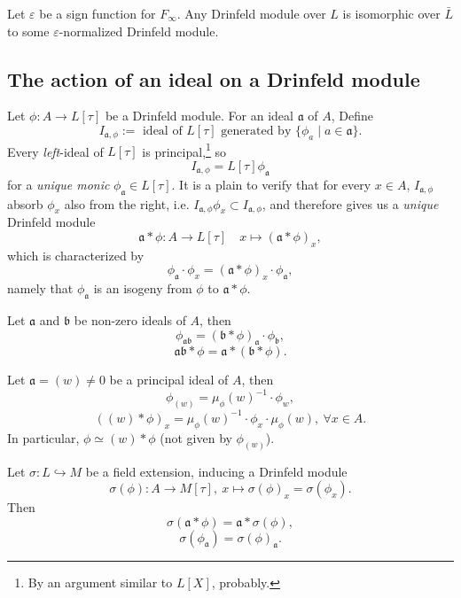 \documentclass{article}
\begin{document}
\begin{lemma}
    Let $\varepsilon$ be a sign function for $F_\infty$.
    Any Drinfeld module over $L$ is isomorphic over $\bar L$ to some $\varepsilon$-normalized Drinfeld module.
\end{lemma}


\subsection{The action of an ideal on a Drinfeld module}
Let $\phi : A\to L[\tau]$ be a Drinfeld module.
For an ideal $\mathfrak{a}$ of $A$, Define 
\[I_{\mathfrak{a}, \phi} := \text{ ideal of } L[\tau] \text{ generated by } \{\phi_a\mid a\in\mathfrak{a}\}.\]
Every \textit{left}-ideal of $L[\tau]$ is principal,\footnote{
    By an argument similar to $L[X]$, probably.
}
so \[I_{\mathfrak{a}, \phi} = L[\tau]\phi_{\mathfrak{a}}\]
for a \textit{unique monic} $\phi_\mathfrak{a}\in L[\tau]$.
It is a plain to verify that for every $x\in A$,
$I_{\mathfrak{a}, \phi}$ absorb $\phi_x$ also from the right,
i.e. $I_{\mathfrak{a}, \phi}\phi_x\subset I_{\mathfrak{a}, \phi}$,
and therefore gives us a \textit{unique} Drinfeld module \[\mathfrak{a}*\phi : A\to L[\tau]\quad x\mapsto (\mathfrak{a}*\phi)_x,\]
which is characterized by\[\phi_\mathfrak{a}\cdot \phi_x = (\mathfrak{a}*\phi)_x\cdot\phi_\mathfrak{a},\]
namely that $\phi_\mathfrak{a}$ is an isogeny from $\phi$ to $\mathfrak{a}*\phi$.

\begin{lemma}\label{action on a Drinfeld module by an ideal}
    Let $\mathfrak{a}$ and $\mathfrak{b}$ be non-zero ideals of $A$,
    then\[
    \phi_{\mathfrak{ab}} = (\mathfrak{b}*\phi)_\mathfrak{a}\cdot \phi_{\mathfrak{b}},\]
    \[\mathfrak{ab}*\phi = \mathfrak{a}*(\mathfrak{b}*\phi).\]
\end{lemma}
\begin{lemma}\label{action on a Drinfeld module by a principal ideal}
    Let $\mathfrak{a} = (w)\ne 0$ be a principal ideal of $A$,
    then \[
    \phi_{(w)} = \mu_\phi(w)^{-1}\cdot\phi_w,\]
    \[
    ((w)*\phi)_x = \mu_\phi(w)^{-1}\cdot\phi_x\cdot\mu_\phi(w),\ \forall x\in A.\]
    In particular, $\phi\simeq (w) * \phi$ (not given by $\phi_{(w)}$).
\end{lemma}
\begin{lemma}\label{action on a Drinfeld module by an ideal commutes with field extension}
    Let $\sigma : L\hookrightarrow M$ be a field extension, inducing a Drinfeld module \[\sigma(\phi) : A\to M[\tau],\ x\mapsto \sigma(\phi)_x = \sigma(\phi_x).\]
    Then \[\sigma(\mathfrak{a}*\phi) = \mathfrak{a} * \sigma(\phi),\]
    \[\sigma(\phi_\mathfrak{a}) = \sigma(\phi)_\mathfrak{a}.\]
\end{lemma}
\end{document}
